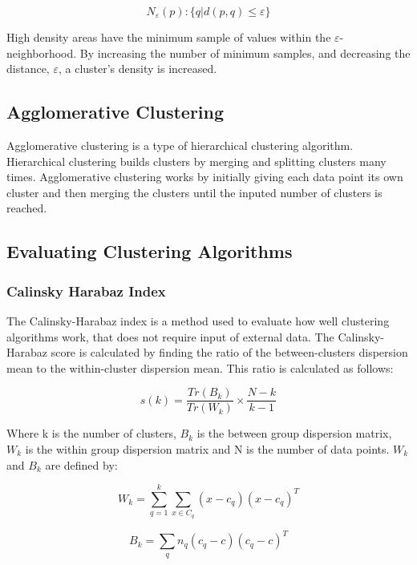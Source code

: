 \documentclass[colorlinks=true,pdfstartview=FitV,linkcolor=blue,
            citecolor=red,urlcolor=magenta]{ligodoc}
\begin{document}
\[N_\varepsilon(p):\{q|d(p,q) \leq \varepsilon\}\]

\par High density areas have the minimum sample of values within the $\varepsilon$-neighborhood. By increasing the number of minimum samples, and decreasing the distance, $\varepsilon$, a cluster's density is increased. \cite{Citation2}\cite{Citation3}

\subsection{Agglomerative Clustering}

\indent

\par Agglomerative clustering is a type of hierarchical clustering algorithm. Hierarchical clustering builds clusters by merging and splitting clusters many times. Agglomerative clustering works by initially giving each data point its own cluster and then merging the clusters until the inputed number of clusters is reached. \cite{Citation2}

\subsection{Evaluating Clustering Algorithms}

\subsubsection{Calinsky Harabaz Index}

\indent

\par The Calinsky-Harabaz index is a method used to evaluate how well clustering algorithms work, that does not require input of external data. The Calinsky-Harabaz score is calculated by finding the ratio of the between-clusters dispersion mean to the within-cluster dispersion mean. This ratio is calculated as follows:

\[s(k) = \frac{Tr(B_k)}{Tr(W_k)}\times\frac{N-k}{k-1}\]

\par Where k is the number of clusters, \(B_k\) is the between group dispersion matrix, \(W_k\) is the within group dispersion matrix and N is the number of data points. \(W_k\) and  \(B_k\) are defined by:

\[W_k = \sum_{q=1}^{k} \sum_{x \in C_q} (x-c_q)(x-c_q)^T\]

\[B_k = \sum_{q} n_q (c_q-c)(c_q-c)^T\]
\end{document}
